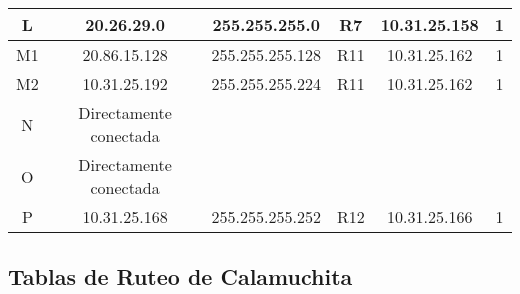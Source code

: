 \begin{tabular}{|c|c|c|c|c|c|}
 	\hline
	L & 20.26.29.0 & 255.255.255.0 & R7 & 10.31.25.158 & 1\\
	\hline
	M1 & 20.86.15.128 & 255.255.255.128 & R11 & 10.31.25.162 & 1\\
	\hline
	M2 & 10.31.25.192 & 255.255.255.224 & R11 & 10.31.25.162 & 1\\
	\hline
	N & Directamente conectada &&&& \\
	\hline
	O & Directamente conectada &&&& \\
	\hline
	P & 10.31.25.168 & 255.255.255.252 & R12 & 10.31.25.166 & 1\\
	\hline
\end{tabular}


\subsection{Tablas de Ruteo de Calamuchita}
